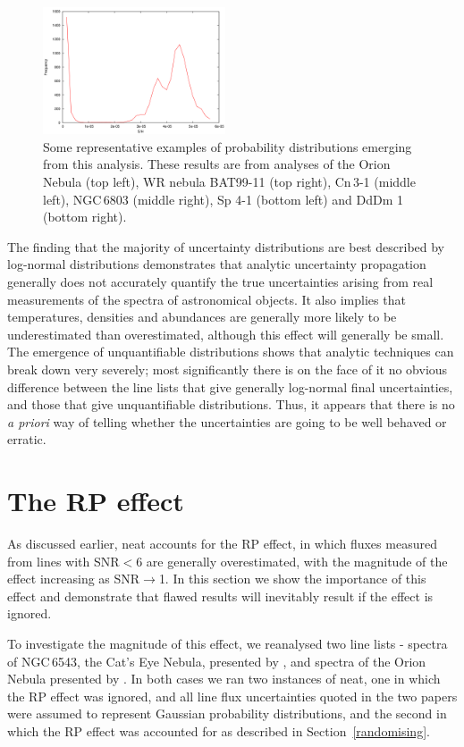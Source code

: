 \documentclass[useAMS,usenatbib]{mn2e}
\begin{document}
\begin{figure}
\includegraphics[width=0.48\textwidth]{figures/plot_binned_DdDm1-3_S_abund_CEL.png}
\caption{Some representative examples of probability distributions emerging from this analysis.  These results are from analyses of the Orion Nebula (top left), WR nebula BAT99-11 (top right), Cn\,3-1 (middle left), NGC\,6803 (middle right), Sp 4-1 (bottom left) and DdDm 1 (bottom right).}
\label{Typical_uncertainties_images}
\end{figure}

The finding that the majority of uncertainty distributions are best described by log-normal distributions demonstrates that analytic uncertainty propagation generally does not accurately quantify the true uncertainties arising from real measurements of the spectra of astronomical objects.  It also implies that temperatures, densities and abundances are generally more likely to be underestimated than overestimated, although this effect will generally be small.  The emergence of unquantifiable distributions shows that analytic techniques can break down very severely; most significantly there is on the face of it no obvious difference between the line lists that give generally log-normal final uncertainties, and those that give unquantifiable distributions.  Thus, it appears that there is no {\it a priori} way of telling whether the uncertainties are going to be well behaved or erratic.

\section{The RP effect}
\label{RPeffect}

As discussed earlier, {\sc neat} accounts for the RP effect, in which fluxes measured from lines with SNR$<$6 are generally overestimated, with the magnitude of the effect increasing as SNR$\to$1.  In this section we show the importance of this effect and demonstrate that flawed results will inevitably result if the effect is ignored.

To investigate the magnitude of this effect, we reanalysed two line lists - spectra of NGC\,6543, the Cat's Eye Nebula, presented by \citet{2004MNRAS.351.1026W}, and spectra of the Orion Nebula presented by \citet{2004MNRAS.355..229E}.  In both cases we ran two instances of {\sc neat}, one in which the RP effect was ignored, and all line flux uncertainties quoted in the two papers were assumed to represent Gaussian probability distributions, and the second in which the RP effect was accounted for as described in Section~\ref{randomising}.
\end{document}
